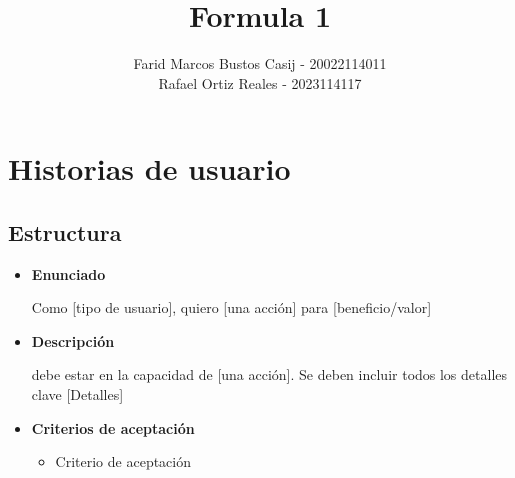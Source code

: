 \documentclass{article}
\title{Formula 1}
\author{Farid Marcos Bustos Casij - 20022114011\\ Rafael Ortiz Reales -  2023114117}
\begin{document}
	\maketitle
	\section{Historias de usuario}
	\subsection*{Estructura}
		\begin{itemize}
			
			\item \large{\textbf{Enunciado}}
			\begin{description}
				Como [tipo de usuario], quiero [una acción] para [beneficio/valor]
			\end{description}
			
			\item \large{\textbf{Descripción}}
			\begin{description}
				 debe estar en la capacidad de [una acción]. Se deben incluir todos los detalles clave [Detalles]
			\end{description}
			
			\item \large{\textbf{Criterios de aceptación}}
			\begin{itemize}
				\item Criterio de aceptación
			\end{itemize}
			
		\end{itemize}
		
\end{document}
